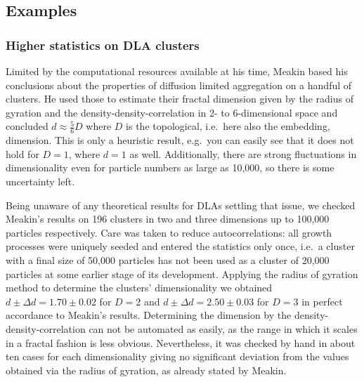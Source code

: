 \documentclass[twocolumn, 10pt]{scrartcl}
\begin{document}
        \subsection{Examples}
           \subsubsection{Higher statistics on DLA clusters}
                Limited by the computational resources available at his time, Meakin based his conclusions about
                the properties of diffusion limited aggregation on a handful of clusters. He used those to estimate
                their fractal dimension given by the radius of gyration and the density-density-correlation in
                2- to 6-dimensional space and concluded $d\approx\frac{5}{6}D$ where $D$ is the topological, i.e.\ here
                also the embedding, dimension. This is only a heuristic result, e.g.\ you can easily see that it does
                not hold for $D=1$, where $d=1$ as well. Additionally, there are strong fluctuations in dimensionality
                even for particle numbers as large as 10,000, so there is some uncertainty left.
                
                Being unaware of any
                theoretical results for DLAs settling that issue, we checked Meakin's results on 196 clusters in
                two and three dimensions up to 100,000 particles respectively. Care was taken to reduce
                autocorrelations: all growth
                processes were uniquely seeded and entered the statistics only once, i.e.\ a cluster with a final
                size of 50,000 particles has not been used as a cluster of 20,000 particles at some earlier stage
                of its development. Applying the radius of gyration method to determine the clusters' dimensionality
                we obtained $d\pm\Delta d=1.70\pm0.02$ for $D=2$ and $d\pm\Delta d=2.50\pm0.03$ for $D=3$ in perfect
                accordance to Meakin's results. Determining the dimension by the density-density-correlation can
                not be automated as easily, as the range in which it scales in a fractal fashion is less obvious.
                Nevertheless, it was checked by hand in about ten cases for each dimensionality giving no significant
                deviation from the values obtained via the radius of gyration, as already stated by Meakin.
\end{document}
